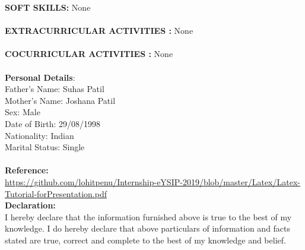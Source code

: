 \documentclass{article}
\begin{document}
\large \textbf{SOFT SKILLS:}	
None\\
\\
\large \textbf{EXTRACURRICULAR ACTIVITIES
:}	
None\\
\\
\large \textbf{COCURRICULAR ACTIVITIES
:}	
None\\
\\
\large \textbf{Personal Details}:\\
Father’s Name: Suhas Patil \\
Mother’s Name: Joshana Patil \\
Sex: Male \\
Date of Birth: 29/08/1998 \\
Nationality: Indian \\
Marital Status: Single \\
\\
\large \textbf{Reference:}\\
\href{Link}{https://github.com/lohitpenu/Internship-eYSIP-2019/blob/master/Latex/Latex-Tutorial-forPresentation.pdf} \\	

\large \textbf{Declaration: }\\
I hereby declare that the information furnished above is true to the best of my knowledge. I do hereby declare that above particulars of information and facts stated are true, correct and complete to the best of my knowledge and belief.\\
\end{document}
